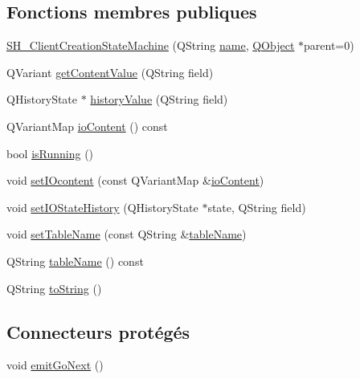 \subsection*{Fonctions membres publiques}
\begin{DoxyCompactItemize}
\item 
\hyperlink{classSimpleHotel_1_1SH__ClientCreationStateMachine_a301eb77d9ad72102d5fa8952980cf8a3}{S\-H\-\_\-\-Client\-Creation\-State\-Machine} (Q\-String \hyperlink{classSimpleHotel_1_1SH__NamedObject_ad144716345034c91cface8f3163a799e}{name}, \hyperlink{classQObject}{Q\-Object} $\ast$parent=0)
\item 
Q\-Variant \hyperlink{classSimpleHotel_1_1SH__InOutStateMachine_a4e2afab69163c7ce53dd6a40c793d5dc}{get\-Content\-Value} (Q\-String field)
\item 
Q\-History\-State $\ast$ \hyperlink{classSimpleHotel_1_1SH__InOutStateMachine_af9de98943b9428ed4144bc6695c1ada0}{history\-Value} (Q\-String field)
\item 
Q\-Variant\-Map \hyperlink{classSimpleHotel_1_1SH__InOutStateMachine_a378618937520bc65b6e25cd187a92aad}{io\-Content} () const 
\item 
bool \hyperlink{classSimpleHotel_1_1SH__GenericStateMachine_a23d9e26143a6732fa5a8f540eb827e03}{is\-Running} ()
\item 
void \hyperlink{classSimpleHotel_1_1SH__InOutStateMachine_a60245aa45ba2b9720965412774e123fb}{set\-I\-Ocontent} (const Q\-Variant\-Map \&\hyperlink{classSimpleHotel_1_1SH__InOutStateMachine_a378618937520bc65b6e25cd187a92aad}{io\-Content})
\item 
void \hyperlink{classSimpleHotel_1_1SH__InOutStateMachine_a7a6675495f101d29e8eb86df84961795}{set\-I\-O\-State\-History} (Q\-History\-State $\ast$state, Q\-String field)
\item 
void \hyperlink{classSimpleHotel_1_1SH__InOutStateMachine_adae23a212e9ba1e590f062994cd367a6}{set\-Table\-Name} (const Q\-String \&\hyperlink{classSimpleHotel_1_1SH__InOutStateMachine_a9fd170fd458e524ac0629b64d5323a45}{table\-Name})
\item 
Q\-String \hyperlink{classSimpleHotel_1_1SH__InOutStateMachine_a9fd170fd458e524ac0629b64d5323a45}{table\-Name} () const 
\item 
Q\-String \hyperlink{classSimpleHotel_1_1SH__GenericStateMachine_ad6dd1d0986c40684410ed94f1f610b12}{to\-String} ()
\end{DoxyCompactItemize}
\subsection*{Connecteurs protégés}
\begin{DoxyCompactItemize}
\item 
void \hyperlink{classSimpleHotel_1_1SH__GenericStateMachine_a37846ee6a4cb4d73cf2aff51cb025615}{emit\-Go\-Next} ()
\end{DoxyCompactItemize}
